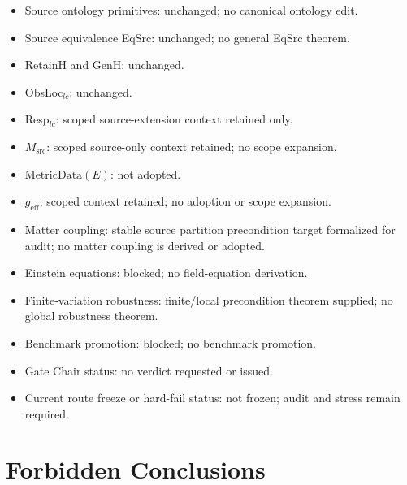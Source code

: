 \begin{itemize}
  \item Source ontology primitives: unchanged; no canonical ontology edit.
  \item Source equivalence EqSrc: unchanged; no general EqSrc theorem.
  \item RetainH and GenH: unchanged.
  \item ObsLoc\(_{lc}\): unchanged.
  \item Resp\(_{lc}\): scoped source-extension context retained only.
  \item \(M_{\mathrm{src}}\): scoped source-only context retained; no scope
    expansion.
  \item \(\mathrm{MetricData}(E)\): not adopted.
  \item \(g_{\mathrm{eff}}\): scoped context retained; no adoption or scope
    expansion.
  \item Matter coupling: stable source partition precondition target
    formalized for audit; no matter coupling is derived or adopted.
  \item Einstein equations: blocked; no field-equation derivation.
  \item Finite-variation robustness: finite/local precondition theorem
    supplied; no global robustness theorem.
  \item Benchmark promotion: blocked; no benchmark promotion.
  \item Gate Chair status: no verdict requested or issued.
  \item Current route freeze or hard-fail status: not frozen; audit and
    stress remain required.
\end{itemize}

\section{Forbidden Conclusions}

